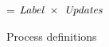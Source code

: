 \begin{figure}
\begin{center}
\begin{minipage}[t]{0.4\textwidth}
\begin{tabbing}
\Next \> = \> $\textit{Label}~\times~\textit{Updates}$ 
\end{tabbing}
\end{minipage}
\end{center}
\caption{Process definitions}
\label{fig:Process:Def}
\end{figure}

